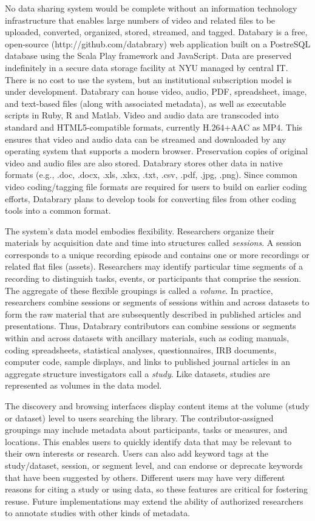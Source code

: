 \documentclass[letterpaper,man,apacite]{apa6}
\begin{document}
No data sharing system would be complete without an information technology infrastructure that enables large numbers of video and related files to be uploaded, converted, organized, stored, streamed, and tagged.
Databary is a free, open-source (http://github.com/databrary) web application built on a PostreSQL database using the Scala Play framework and JavaScript.
Data are preserved indefinitely in a secure data storage facility at NYU managed by central IT.
There is no cost to use the system, but an institutional subscription model is under development.
Databrary can house video, audio, PDF, spreadsheet, image, and text-based files (along with associated metadata), as well as executable scripts in Ruby, R and Matlab.
Video and audio data are transcoded into standard and HTML5-compatible formats, currently H.264+AAC as MP4.
This ensures that video and audio data can be streamed and downloaded by any operating system that supports a modern browser.
Preservation copies of original video and audio files are also stored.
Databrary stores other data in native formats (e.g., .doc, .docx, .xls, .xlsx, .txt, .csv, .pdf, .jpg, .png).
Since common video coding/tagging file formats are required for users to build on earlier coding efforts, Databrary plans to develop tools for converting files from other coding tools into a common format.

The system's data model embodies flexibility. 
Researchers organize their materials by acquisition date and time into structures called \emph{sessions}.
A session corresponds to a unique recording episode and contains one or more recordings or related flat files (assets). 
Researchers may identify particular time segments of a recording to distinguish tasks, events, or
participants that comprise the session. 
The aggregate of these flexible groupings is called a \emph{volume}. 
In practice, researchers combine sessions or segments of sessions within and across datasets to form the raw material that are subsequently described in published articles and presentations. 
Thus, Databrary contributors can combine sessions or segments within and across datasets with ancillary
materials, such as coding manuals, coding spreadsheets, statistical analyses, questionnaires, IRB documents, computer code, sample displays, and links to published journal articles in an aggregate structure investigators call a \emph{study}. 
Like datasets, studies are represented as volumes in the data model.

The discovery and browsing interfaces display content items at the volume (study or dataset) level to users searching the library. 
The contributor-assigned groupings may include metadata about participants, tasks or measures, and locations.
This enables users to quickly identify data that may be relevant to their own interests or research.
Users can also add keyword tags at the study/dataset, session, or segment level, and can endorse or deprecate keywords that have been suggested by others. 
Different users may have very different reasons for citing a study or using data, so these features are critical for fostering resuse. 
Future implementations may extend the ability of authorized researchers to annotate studies with other kinds of metadata.
\end{document}
